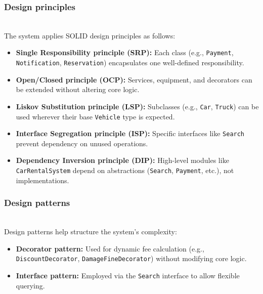 \subsubsection{Design principles}\label{YsQlUTa-sxSCvy5W1p3-J}
\\
The system applies SOLID design principles as follows:

\begin{itemize}
\item
\protect{}\label{jYDvSks9PHOZQLl1d0xRY}
\textbf{Single Responsibility principle (SRP):} Each class (e.g., \texttt{Payment}, \texttt{Notification}, \texttt{Reservation}) encapsulates one well-defined responsibility.
\item
\protect{}\label{ljBscaPOT58tEZCVmM5wB}
\textbf{Open/Closed principle (OCP):} Services, equipment, and decorators can be extended without altering core logic.
\item
\protect{}\label{DWzDL4pfTazVuJsIYtsLW}
\textbf{Liskov Substitution principle (LSP):} Subclasses (e.g., \texttt{Car}, \texttt{Truck}) can be used wherever their base \texttt{Vehicle} type is expected.
\item
\protect{}\label{-UxBdzyOb18madbbCkMlp}
\textbf{Interface Segregation principle (ISP):} Specific interfaces like \texttt{Search} prevent dependency on unused operations.
\item
\protect{}\label{tuk67ehXAbc5PR8XPLJrj}
\textbf{Dependency Inversion principle (DIP):} High-level modules like \texttt{CarRentalSystem} depend on abstractions (\texttt{Search}, \texttt{Payment}, etc.), not implementations.
\end{itemize}

\subsubsection{Design patterns}\label{7-NrEzAq3q9yyNF5pJ9nD}
\\
Design patterns help structure the system's complexity:

\begin{itemize}
\item
\protect{}\label{MSxHN-j_VKu2R-3llG8YU}
\textbf{Decorator pattern:} Used for dynamic fee calculation (e.g., \texttt{DiscountDecorator}, \texttt{DamageFineDecorator}) without modifying core logic.
\item
\protect{}\label{sfdrIUPeQEXxqurBmuQ1z}
\textbf{Interface pattern:} Employed via the \texttt{Search} interface to allow flexible querying.
\end{itemize}

